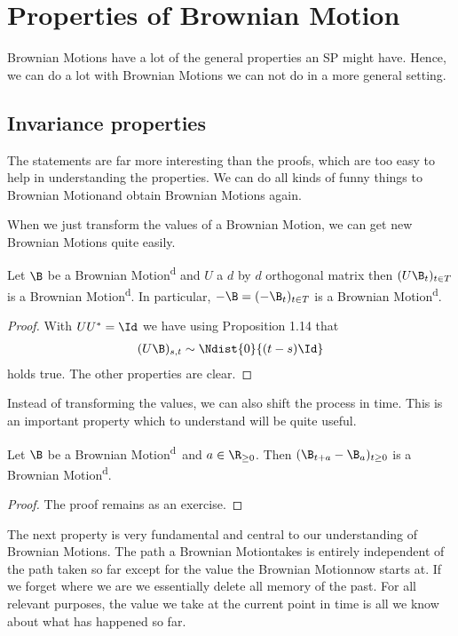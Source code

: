\def\BM{Brownian Motion}
\def\BMd{\BM\textsuperscript{d}}
\chapter{Properties of \BM}

\BM s have a lot of the general properties an SP might have.
Hence, we can do a lot with \BM s we can not do in a more general setting.

\section{Invariance properties}
The statements are far more interesting than the proofs,
which are too easy to help in understanding the properties.
We can do all kinds of funny things to \BM and obtain \BM s again.

When we just transform the values of a \BM,
we can get new \BM s quite easily.

\begin{prop}
	Let \(\B\) be a \BMd
	and \(U\) a $d$ by $d$ orthogonal matrix
	then \((U\B_t)_{t\in T}\) is a \BMd.
	In particular, \(-\B = (-\B_t)_{t\in T}\) is a \BMd.
\end{prop}

\begin{proof}
	With \(UU^* = \Id\) we have using Proposition 1.14 that
	\begin{align*}
		(U\B)_{s,t} \sim \Ndist{0}{(t-s)\Id}
	\end{align*}
	holds true. The other properties are clear.
\end{proof}

Instead of transforming the values,
we can also shift the process in time.
This is an important property which to understand will be quite useful.

\begin{prop}
Let $\B$ be a \BMd\ and $a \in \R_{\geq 0}$.
Then $(\B_{t+a}-\B_a)_{t \geq 0}$ is a \BMd.
\end{prop}
\begin{proof}
The proof remains as an exercise.
\end{proof}

The next property is very fundamental
and central to our understanding of \BM s.
The path a \BM takes is entirely independent of the path taken so far
except for the value the \BM now starts at.
If we forget where we are
we essentially delete all memory of the past.
For all relevant purposes,
the value we take at the current point in time
is all we know about what has happened so far.


